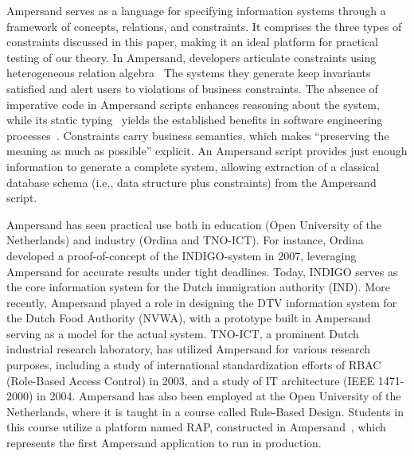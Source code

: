 \documentclass[runningheads]{llncs}
\begin{document}
   Ampersand serves as a language for specifying information systems through a framework of concepts, relations, and constraints.
   It comprises the three types of constraints discussed in this paper, making it an ideal platform for practical testing of our theory.
   In Ampersand, developers articulate constraints using heterogeneous relation algebra~\cite{Hattensperger1999,Alloy2006}
   The systems they generate keep invariants satisfied and alert users to violations of business constraints.
   The absence of imperative code in Ampersand scripts enhances reasoning about the system,
   while its static typing~\cite{vdWoude2011} yields the established benefits in software engineering processes~\cite{HanenbergKRTS14,Petersen2014}.
   Constraints carry business semantics, which makes ``preserving the meaning as much as possible'' explicit.
   An Ampersand script provides just enough information to generate a complete system,
   allowing extraction of a classical database schema (i.e., data structure plus constraints) from the Ampersand script.

   Ampersand has seen practical use both in education (Open University of the Netherlands) and industry (Ordina and TNO-ICT).
   For instance, Ordina developed a proof-of-concept of the INDIGO-system in 2007,
   leveraging Ampersand for accurate results under tight deadlines.
   Today, INDIGO serves as the core information system for the Dutch immigration authority (IND).
   More recently, Ampersand played a role in designing the DTV information system for the Dutch Food Authority (NVWA),
   with a prototype built in Ampersand serving as a model for the actual system.
   TNO-ICT, a prominent Dutch industrial research laboratory, has utilized Ampersand for various research purposes,
   including a study of international standardization efforts of RBAC (Role-Based Access Control) in 2003,
   and a study of IT architecture (IEEE 1471-2000)\cite{IEEE1471} in 2004.
   Ampersand has also been employed at the Open University of the Netherlands,
   where it is taught in a course called Rule-Based Design\cite{RBD}.
   Students in this course utilize a platform named RAP, constructed in Ampersand~\cite{Michels2015},
   which represents the first Ampersand application to run in production.
\end{document}
